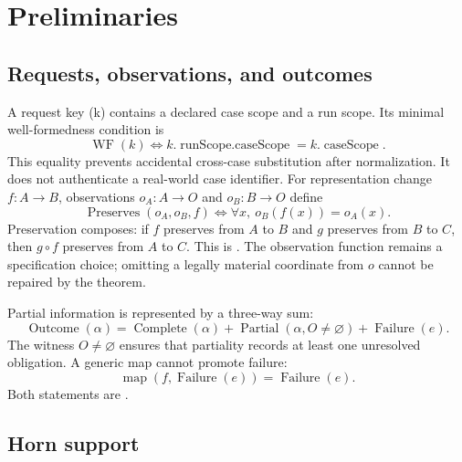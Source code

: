 \section{Preliminaries}
\label{sec:preliminaries}

\subsection{Requests, observations, and outcomes}

A request key (k) contains a declared case scope and a run scope. Its minimal well-formedness condition is
\begin{equation}
\operatorname{WF}(k)\iff
k.\operatorname{runScope.caseScope}=k.\operatorname{caseScope}.
\label{eq:request-wf}
\end{equation}
This \formalized{} equality prevents accidental cross-case substitution after normalization. It does not authenticate a real-world case identifier. For representation change $f:A\to B$, observations $o_A:A\to O$ and $o_B:B\to O$ define
\begin{equation}
\operatorname{Preserves}(o_A,o_B,f)
\iff\forall x,\ o_B(f(x))=o_A(x).
\label{eq:observation-preservation}
\end{equation}
Preservation composes: if $f$ preserves from $A$ to $B$ and $g$ preserves from $B$ to $C$, then $g\circ f$ preserves from $A$ to $C$. This is \formalized{}. The observation function remains a specification choice; omitting a legally material coordinate from $o$ cannot be repaired by the theorem.

Partial information is represented by a three-way sum:
\begin{equation}
\operatorname{Outcome}(\alpha)=
\operatorname{Complete}(\alpha)+
\operatorname{Partial}(\alpha,O\neq\varnothing)+
\operatorname{Failure}(e).
\label{eq:outcome}
\end{equation}
The witness $O\neq\varnothing$ ensures that partiality records at least one unresolved obligation. A generic map cannot promote failure:
\begin{equation}
\operatorname{map}(f,\operatorname{Failure}(e))=
\operatorname{Failure}(e).
\label{eq:map-failure}
\end{equation}
Both statements are \formalized{}.

\subsection{Horn support}

